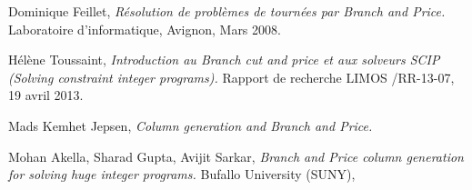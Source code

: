 \begin{thebibliography}{9}

  Dominique Feillet,
  \emph{Résolution de problèmes de tournées par Branch and Price.}
  Laboratoire d'informatique, Avignon,
  Mars 2008.

  Hélène Toussaint,
  \emph{Introduction au Branch cut and price et aux solveurs SCIP (Solving constraint integer programs).}
  Rapport de recherche LIMOS /RR-13-07,
  19 avril 2013.

  Mads Kemhet Jepsen,
  \emph{Column generation and Branch and Price.}
 
  Mohan Akella, Sharad Gupta, Avijit Sarkar,
  \emph{Branch and Price column generation for solving huge integer programs.}
  Bufallo University (SUNY),

\end{thebibliography}
